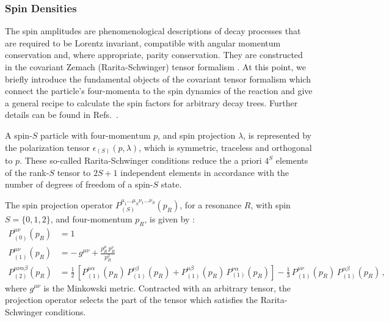 \subsubsection{Spin Densities}

The spin amplitudes are phenomenological descriptions
of decay processes that 
are required to be Lorentz invariant,
compatible with angular momentum conservation and,
where appropriate, parity conservation.
They are constructed in the covariant Zemach (Rarita-Schwinger) tensor formalism
\cite{Zemach,Rarita,helicity3}.
At this point, we briefly introduce 
the fundamental objects of the covariant tensor formalism 
which connect the particle's four-momenta to the spin dynamics of the reaction
and give a general recipe to calculate the spin factors for arbitrary decay trees.
Further details can be found in Refs.~\cite{Zou, Filippini}.

A spin-$S$ particle with four-momentum $p$, and spin projection $\lambda$, is represented 
by the polarization tensor $\epsilon_{(S)}(p,\lambda)$, which is symmetric, traceless and orthogonal to $p$.
These so-called Rarita-Schwinger conditions reduce the a priori $4^{S}$  elements of the rank-$S$ tensor to 
$2S +1$ independent  elements in accordance with the number of degrees of freedom of a spin-$S$ state\cite{Rarita,Zhu}.

The spin projection operator $P^{\mu_{1} \dots \mu_{S} \nu_{1} \dots \nu_{S}}_{(S)}(p_{R})$,  
for a resonance $R$, with spin $S = \{0,1,2\}$, and four-momentum $p_{R}$,
is given by \cite{Filippini}:
\begin{align}
	\nonumber
	P_{(0)}^{\mu \nu}(p_{R}) &= 1 \\
	\nonumber
	P_{(1)}^{\mu \nu}(p_{R}) &= %
	- \, g^{\mu \nu} + \frac{p_{R}^{\mu} \, p_{R}^{\nu}}{p_{R}^{2}}    \\
	P_{(2)}^{\mu \nu \alpha \beta}(p_{R})  &=
	 \frac{1}{2} \,  \left[ P_{(1)}^{\mu \alpha}(p_{R})  \, P_{(1)}^{\nu \beta}(p_{R})  + P_{(1)}^{\mu \beta}(p_{R})  \, P_{(1)}^{\nu \alpha}(p_{R}) \right] - \frac{1}{3} \, P_{(1)}^{\mu \nu}(p_{R}) 
	 \, P_{(1)}^{\alpha \beta}(p_{R})    \,,
	\label{eq:pol1}
\end{align}
where $ g^{\mu \nu}$ %
is the Minkowski metric.
Contracted with an arbitrary tensor, the projection operator selects 
the part of the tensor which satisfies the Rarita-Schwinger conditions.

